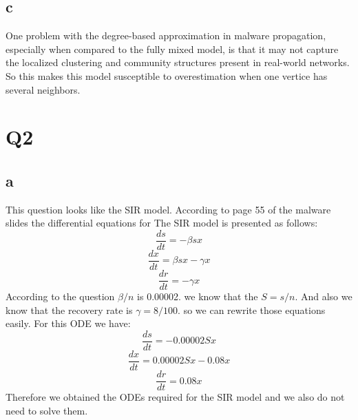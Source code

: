 \documentclass[a4paper, 11pt]{article}
\begin{document}
\subsection{c}
One problem with the degree-based approximation in malware propagation,
especially when compared to the fully mixed model, is that it may not capture
the localized clustering and community structures present in real-world
networks. So this makes this model susceptible to overestimation when one
vertice has several neighbors.
\section{Q2}
\subsection{a}
This question looks like the SIR model.
According to page 55 of the malware slides the differential equations for
The SIR model is presented as follows:
\begin{equation}
    \frac{ds}{dt} = -\beta sx
\end{equation}
\begin{equation}
    \frac{dx}{dt} = \beta sx - \gamma x
\end{equation}
\begin{equation}
    \frac{dr}{dt} = -\gamma x
\end{equation}
According to the question $\beta / n$ is 0.00002. we know that the $S = s / n$.
And also we know that the recovery rate is $\gamma = 8 / 100$.
so we can rewrite those equations easily. For this ODE we have:
\begin{equation}
    \frac{ds}{dt} = -0.00002Sx
\end{equation}
\begin{equation}
    \frac{dx}{dt} = 0.00002Sx - 0.08x
\end{equation}
\begin{equation}
    \frac{dr}{dt} = 0.08x
\end{equation}
Therefore we obtained the ODEs required for the SIR model and we also do not
need to solve them.
\end{document}
